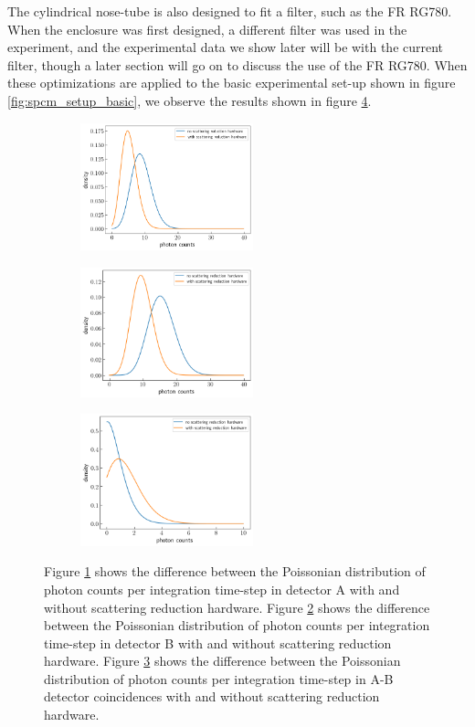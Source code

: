 \documentclass[letterpaper, 11 pt]{article}
\begin{document}
The cylindrical nose-tube is also designed to fit a filter, such as the FR
RG780. When the enclosure was first designed, a different filter was used in the
experiment, and the experimental data we show later will be with the current filter, though a
later section will go on to discuss the use of the FR RG780. When these optimizations are applied to the basic experimental
set-up shown in figure \ref{fig:spcm_setup_basic}, we observe the results shown
in figure \ref{fig:scatter_reduce}.
\begin{figure}[H]%
    \centering
    \begin{subfigure}{.3\textwidth}
    \includegraphics[width=5cm]{ch1_scatter.png}
    \caption{ }
    \label{fig:1}
    \end{subfigure}
    \begin{subfigure}{.3\textwidth}
    \includegraphics[width = 5cm]{ch2_scatter.png}
    \caption{ }
    \label{fig:2}
    \end{subfigure}
    \begin{subfigure}{.3\textwidth}
    \includegraphics[width = 5cm]{cc_scatter.png}
    \caption{ }
    \label{fig:cc}
    \end{subfigure}
    \caption{Figure \ref{fig:1} shows the difference between the Poissonian
    distribution of photon counts per integration time-step in detector A with
    and without scattering reduction hardware. Figure \ref{fig:2} shows the
    difference between the Poissonian distribution of photon counts per
    integration time-step in detector B with and without scattering reduction
    hardware. Figure \ref{fig:cc} shows the difference between the Poissonian
    distribution of photon counts per integration time-step in A-B detector
    coincidences with and without scattering reduction hardware.}
    \label{fig:scatter_reduce}
\end{figure}
\end{document}
